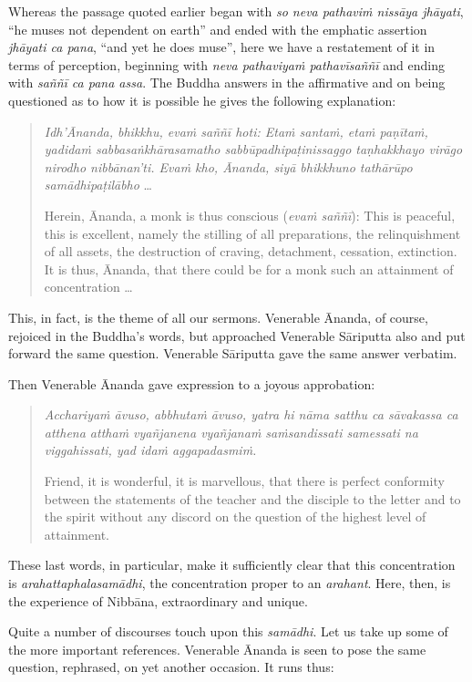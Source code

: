 Whereas the passage quoted earlier began with \emph{so neva pathaviṁ nissāya jhāyati}, ``he muses not dependent on earth'' and ended with the emphatic assertion \emph{jhāyati ca pana}, ``and yet he does muse'', here we have a restatement of it in terms of perception, beginning with \emph{neva pathaviyaṁ pathavīsaññī} and ending with \emph{saññī ca pana assa}. The Buddha answers in the affirmative and on being questioned as to how it is possible he gives the following explanation:

\begin{quote}
\emph{Idh'Ānanda, bhikkhu, evaṁ saññī hoti: Etaṁ santaṁ, etaṁ paṇītaṁ, yadidaṁ sabbasaṅkhārasamatho sabbūpadhipaṭinissaggo taṇhakkhayo virāgo nirodho nibbānan'ti. Evaṁ kho, Ānanda, siyā bhikkhuno tathārūpo samādhipaṭilābho} \ldots{}

Herein, Ānanda, a monk is thus conscious (\emph{evaṁ saññī}): This is peaceful, this is excellent, namely the stilling of all preparations, the relinquishment of all assets, the destruction of craving, detachment, cessation, extinction. It is thus, Ānanda, that there could be for a monk such an attainment of concentration \ldots{}
\end{quote}

This, in fact, is the theme of all our sermons. Venerable Ānanda, of course, rejoiced in the Buddha's words, but approached Venerable Sāriputta also and put forward the same question. Venerable Sāriputta gave the same answer verbatim.

Then Venerable Ānanda gave expression to a joyous approbation:

\begin{quote}
\emph{Acchariyaṁ āvuso, abbhutaṁ āvuso, yatra hi nāma satthu ca sāvakassa ca atthena atthaṁ vyañjanena vyañjanaṁ saṁsandissati samessati na viggahissati, yad idaṁ aggapadasmiṁ.}

Friend, it is wonderful, it is marvellous, that there is perfect conformity between the statements of the teacher and the disciple to the letter and to the spirit without any discord on the question of the highest level of attainment.
\end{quote}

These last words, in particular, make it sufficiently clear that this concentration is \emph{arahattaphalasamādhi}, the concentration proper to an \emph{arahant}. Here, then, is the experience of Nibbāna, extraordinary and unique.

Quite a number of discourses touch upon this \emph{samādhi}. Let us take up some of the more important references. Venerable Ānanda is seen to pose the same question, rephrased, on yet another occasion. It runs thus:

